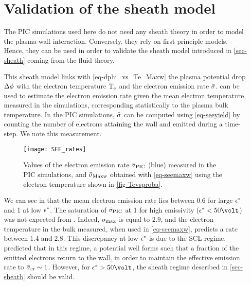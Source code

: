 
\section{Validation of the sheath model }
  \label{sec-sheath_validation}
  
  The \ac{PIC} simulations used here do not need any sheath theory in order to model the plasma-wall interaction.
  Conversely, they rely on first principle models.
  Hence, they can be used in order to validate the sheath model introduced in \cref{sec-sheath} coming from the fluid theory.
  
  This sheath model links with \cref{eq-dphi_vs_Te_Maxw} the plasma potential drop $\Delta \phi$ with the electron temperature $\mathrm{T_e}$ and the electron emission rate $ \bar{\sigma }$.
   can be used to estimate the electron emission rate given the mean electron temperature measured in the simulations, corresponding statistically to the plasma bulk temperature.   
  In the \ac{PIC} simulations, $ \bar{\sigma }$ can be computed using \cref{eq-seeyield} by counting the number of electrons attaining the wall and emitted during a time-step.
  We note \ratepic this measurement.
  \vspace{1em}
   
  \begin{figure}[hbt]
    \centering
    \texttt{[image: SEE\_rates]}
    \caption{Values of the electron emission rate $ \bar{\sigma }_{\rm PIC}$ (blue) measured in the \acs{PIC} simulations, and $  \bar{\sigma }_{\rm Maxw}$ obtained with \cref{eq-seemaxw} using the electron temperature shown in \cref{fig-Tevsproba}. }
    \label{fig-seeparamesMaxw}
  \end{figure}
  
  
  We can see in  that the mean electron emission rate lies between 0.6 for large $\epsilon^{*}$ and 1 at low $\epsilon^{*}$.
  The saturation of $ \bar{\sigma }_{\rm PIC}$ at 1 for high emissivity ($\crover < 50 \volt$) was not expected from \ratemaxw.
  Indeed, $\sigma _{\rm max} $ is equal to 2.9, and the electron temperature in the bulk measured, when used in \cref{eq-seemaxw}, predicts a rate between 1.4 and 2.8.
  This discrepancy at low $\epsilon^{*}$ is due to the \ac{SCL} regime.
  \citet{hobbs1967} predicted that in this regime, a potential well forms such that a fraction of the emitted electrons return to the wall, in order to maintain the effective emission rate to $ \bar{\sigma }_{\rm cr}\sim1$.
  However, for $\crover > 50 \volt$, the sheath regime described in \cref{sec-sheath} should be valid.
   
